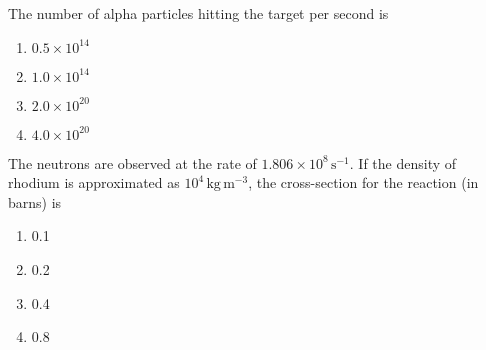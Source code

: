     \item  The number of alpha particles hitting the target per second is
    \begin{multicols}{4}
    \begin{enumerate}
        \item $0.5 \times 10^{14}$
        \item $1.0 \times 10^{14}$
        \item $2.0 \times 10^{20}$
        \item $4.0 \times 10^{20}$
    \end{enumerate}
    \end{multicols}

    \item  The neutrons are observed at the rate of $1.806 \times 10^8 \, \text{s}^{-1}$. If the density of rhodium is approximated as $10^4 \, \text{kg} \, \text{m}^{-3}$, the cross-section for the reaction (in barns) is
    \begin{multicols}{4}
    \begin{enumerate}
        \item 0.1
        \item 0.2
        \item 0.4
        \item 0.8
    \end{enumerate}
    \end{multicols}



